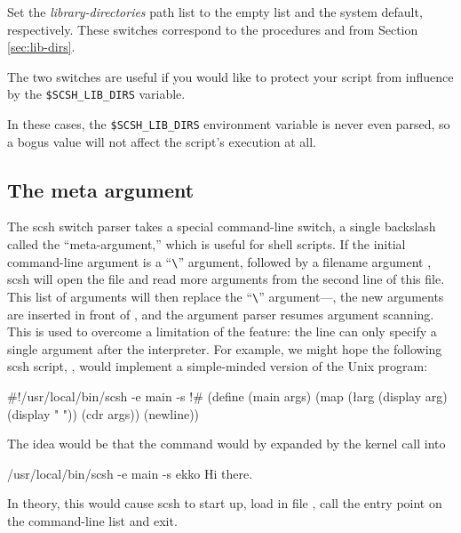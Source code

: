 \begin{itemize}
    Set the \textit{library-directories} path list to the empty list and
    the system default, respectively. These switches correspond to
    the procedures  and  from Section
    \ref{sec:lib-dirs}.
        
    The two switches are useful if you would like to protect your
    script from influence by the \texttt{\$SCSH\_LIB\_DIRS} variable.

    In these cases, the \texttt{\$SCSH\_LIB\_DIRS} environment variable is never
    even parsed, so a bogus value will not affect the script's
    execution at all.
\end{itemize}

\subsection{The meta argument}
\label{sec:meta-arg}
The scsh switch parser takes a special command-line switch,
a single backslash called the ``meta-argument,'' which is useful for 
shell scripts.
If the initial command-line argument is a ``\verb|\|''
argument, followed by a filename argument , scsh will open the file
 and read more arguments from the second line of this file. 
This list of arguments will then replace the ``\verb|\|'' argument---\ie,
the new arguments are inserted in front of , 
and the argument parser resumes argument scanning.
This is used to overcome a limitation of the \ex{\#!} feature: 
the \ex{\#!} line can only specify a single argument after the interpreter.
For example, we might hope the following scsh script, , 
would implement a simple-minded version of the Unix  program:
\begin{code}
#!/usr/local/bin/scsh -e main -s
!#
(define (main args)
  (map (\l{arg} (display arg) (display " "))
       (cdr args))
  (newline))\end{code}
%   
The idea would be that the command
would by expanded by the  kernel call into
%
\begin{code}
/usr/local/bin/scsh -e main -s ekko Hi there.\end{code}
%
In theory, this would cause scsh to start up, load in file ,
call the entry point on the command-line list
and exit.

